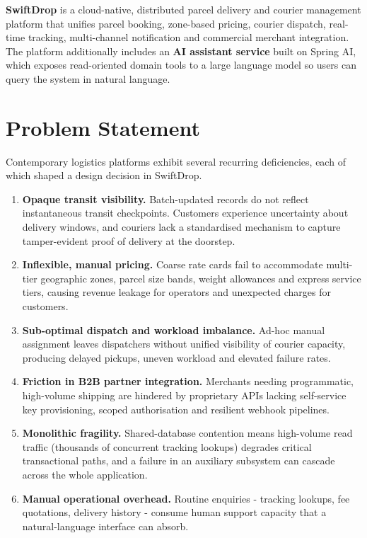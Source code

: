 \documentclass[11pt,a4paper,oneside,openany]{report}
\begin{document}
\textbf{SwiftDrop} is a cloud-native, distributed parcel delivery and courier management platform
that unifies parcel booking, zone-based pricing, courier dispatch, real-time tracking,
multi-channel notification and commercial merchant integration. The platform additionally
includes an \textbf{AI assistant service} built on Spring AI, which exposes read-oriented domain
tools to a large language model so users can query the system in natural language.

\section{Problem Statement}
Contemporary logistics platforms exhibit several recurring deficiencies, each of which shaped a
design decision in SwiftDrop.

\begin{enumerate}[leftmargin=*]
\item \textbf{Opaque transit visibility.} Batch-updated records do not reflect instantaneous
transit checkpoints. Customers experience uncertainty about delivery windows, and couriers lack a
standardised mechanism to capture tamper-evident proof of delivery at the doorstep.

\item \textbf{Inflexible, manual pricing.} Coarse rate cards fail to accommodate multi-tier
geographic zones, parcel size bands, weight allowances and express service tiers, causing revenue
leakage for operators and unexpected charges for customers.

\item \textbf{Sub-optimal dispatch and workload imbalance.} Ad-hoc manual assignment leaves
dispatchers without unified visibility of courier capacity, producing delayed pickups, uneven
workload and elevated failure rates.

\item \textbf{Friction in B2B partner integration.} Merchants needing programmatic, high-volume
shipping are hindered by proprietary APIs lacking self-service key provisioning, scoped
authorisation and resilient webhook pipelines.

\item \textbf{Monolithic fragility.} Shared-database contention means high-volume read traffic
(thousands of concurrent tracking lookups) degrades critical transactional paths, and a failure in
an auxiliary subsystem can cascade across the whole application.

\item \textbf{Manual operational overhead.} Routine enquiries - tracking lookups, fee quotations,
delivery history - consume human support capacity that a natural-language interface can absorb.
\end{enumerate}
\end{document}
